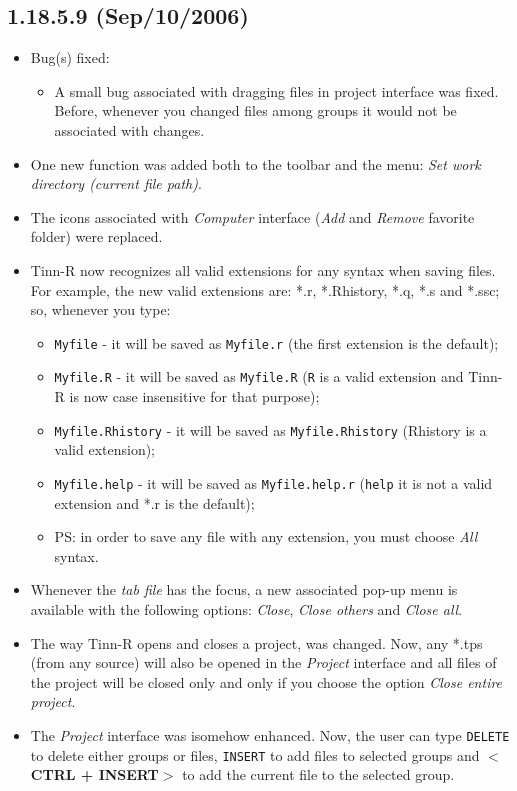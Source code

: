 \subsection*{1.18.5.9 (Sep/10/2006)}
\begin{itemize}
  \item Bug(s) fixed:
    \begin{itemize}
      \item A small bug associated with dragging files in project interface
        was fixed. Before, whenever you changed files among groups it
        would not be associated with changes.
    \end{itemize}
  \item One new function was added both to the \RR{} toolbar and the \RR{}
    menu: \textit{Set work directory (current file path)}.
  \item The icons associated with \textit{Computer} interface (\textit{Add}
    and \textit{Remove} favorite folder) were replaced.
  \item Tinn-R now recognizes all valid extensions for any syntax when
    saving files. For example, the new valid \RR{} extensions are: *.r,
    *.Rhistory, *.q, *.s and *.ssc; so, whenever you type:
    \begin{itemize}
      \item \texttt{Myfile} - it will be saved as \texttt{Myfile.r} (the
        first extension is the default);
      \item \texttt{Myfile.R} - it will be saved as \texttt{Myfile.R}
        (\texttt{R} is a valid extension and Tinn-R is now case insensitive
        for that purpose);
      \item \texttt{Myfile.Rhistory} - it will be saved as
        \texttt{Myfile.Rhistory} (Rhistory is a valid extension);
      \item \texttt{Myfile.help} - it will be saved as \texttt{Myfile.help.r}
        (\texttt{help} it is not a valid extension and *.r is the default);
      \item PS: in order to save any file with any extension, you must choose
        \textit{All} syntax.
    \end{itemize}
  \item Whenever the \textit{tab file} has the focus, a new associated
    pop-up menu is available with the following options: \textit{Close},
    \textit{Close others} and \textit{Close all}.
  \item The way Tinn-R opens and closes a project, was changed. Now, any *.tps
    (from any source) will also be opened in the \textit{Project} interface
    and all files of the project will be closed only and only if you choose
    the option \textit{Close entire project}.
  \item The \textit{Project} interface was isomehow enhanced. Now, the user
    can type \texttt{DELETE} to delete either groups or files, \texttt{INSERT}
    to add files to selected groups and $<$\textbf{CTRL + INSERT}$>$ to add
    the current file to the selected group.
\end{itemize}


